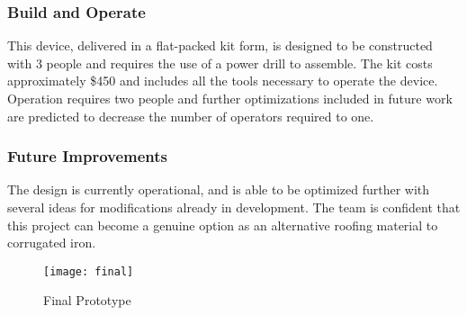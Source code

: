 \documentclass[paper=letter, fontsize=12pt]{article}
\begin{document}
\subsubsection*{Build and Operate}
This device, delivered in a flat-packed kit form, is designed to be constructed with 3 people and requires the use of a power drill to assemble. The kit costs approximately \$450 and includes all the tools necessary to operate the device. Operation requires two people and further optimizations included in future work are predicted to decrease the number of operators required to one. 
\subsubsection*{Future Improvements}
The design is currently operational, and is able to be optimized further with several ideas for modifications already in development. The team is confident that this project can become a genuine option as an alternative roofing material to corrugated iron. 

  \begin{figure}[ht!]
\centering
\texttt{[image: final]}
\caption{Final Prototype}
\label{fig:finalproto}
\end{figure}




\end{document}
